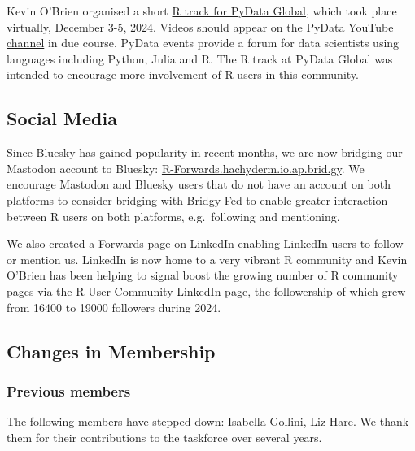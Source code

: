 Kevin O'Brien organised a short \href{https://pydata.org/global2024/schedule\#2024-12-05}{R track for PyData Global},
which took place virtually, December 3-5, 2024. Videos should appear on the \href{https://www.youtube.com/@PyDataTV}{PyData YouTube channel} in due course. PyData events provide
a forum for data scientists using languages including Python, Julia and R. The
R track at PyData Global was intended to encourage more involvement of R users
in this community.

\hypertarget{social-media}{%
\subsection{Social Media}\label{social-media}}

Since Bluesky has gained popularity in recent months, we are now bridging our
Mastodon account to Bluesky: \href{https://bsky.app/profile/R-Forwards.hachyderm.io.ap.brid.gy}{R-Forwards.hachyderm.io.ap.brid.gy}.
We encourage Mastodon and Bluesky users that do not have an account on both
platforms to consider bridging with \href{https://fed.brid.gy/docs}{Bridgy Fed} to
enable greater interaction between R users on both platforms, e.g.~following
and mentioning.

We also created a \href{https://www.linkedin.com/company/r-forwards}{Forwards page on LinkedIn}
enabling LinkedIn users to follow or mention us. LinkedIn is now home to a very
vibrant R community and Kevin O'Brien has been helping to signal boost the
growing number of R community pages via the \href{https://www.linkedin.com/company/37901993/}{R User Community LinkedIn page},
the followership of which grew from 16400 to 19000 followers during 2024.

\hypertarget{changes-in-membership}{%
\subsection{Changes in Membership}\label{changes-in-membership}}

\hypertarget{previous-members}{%
\subsubsection{Previous members}\label{previous-members}}

The following members have stepped down: Isabella Gollini, Liz Hare. We thank
them for their contributions to the taskforce over several years.


\address{%
Heather Turner\\
University of Warwick\\%
Coventry, United Kingdom\\
%
\url{https://warwick.ac.uk/heatherturner}\\%
\textit{ORCiD: \href{https://orcid.org/0000-0002-1256-3375}{0000-0002-1256-3375}}\\%
\href{mailto:heather.turner@r-project.org}{\nolinkurl{heather.turner@r-project.org}}%
}
